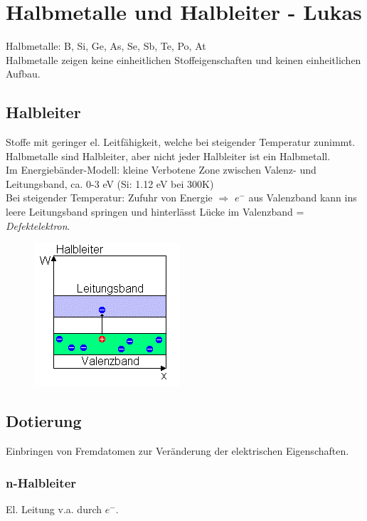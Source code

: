 \section{Halbmetalle und Halbleiter - Lukas}
Halbmetalle: B, Si, Ge, As, Se, Sb, Te, Po, At \\

Halbmetalle zeigen keine einheitlichen Stoffeigenschaften und keinen einheitlichen Aufbau. \\

\subsection{Halbleiter}
Stoffe mit geringer el. Leitfähigkeit, welche bei steigender Temperatur zunimmt. Halbmetalle sind Halbleiter, aber nicht jeder Halbleiter ist ein Halbmetall. \\

Im Energiebänder-Modell: kleine Verbotene Zone zwischen Valenz- und Leitungsband, ca. 0-3 eV (Si: 1.12 eV bei 300K) \\

Bei steigender Temperatur: Zufuhr von Energie $\Rightarrow$ $e^-$ aus Valenzband kann ins leere Leitungsband springen und hinterlässt Lücke im Valenzband = \emph{Defektelektron}.

\begin{figure}[htbp]
	\centering
	\includegraphics[width=0.4\linewidth]{images/4_Halbleiter_Energiebaender.png}
\end{figure}

\subsection{Dotierung}
Einbringen von Fremdatomen zur Veränderung der elektrischen Eigenschaften.

\subsubsection{n-Halbleiter}
El. Leitung v.a. durch $e^-$. \\

